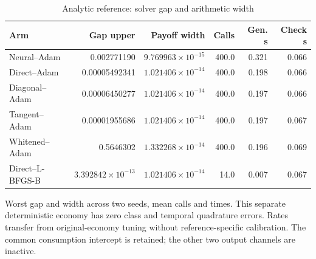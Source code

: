 \begin{table}[htbp]\centering\small
\caption{Analytic reference: solver gap and arithmetic width}\label{tab:r24reference}
\begin{tabular}{lrrrrr}\toprule
Arm & Gap upper & Payoff width & Calls & Gen. s & Check s\\\midrule
Neural--Adam & 0.002771190 & $9.769963\times10^{-15}$ & 400.0 & 0.321 & 0.066\\
Direct--Adam & 0.00005492341 & $1.021406\times10^{-14}$ & 400.0 & 0.198 & 0.066\\
Diagonal--Adam & 0.00006450277 & $1.021406\times10^{-14}$ & 400.0 & 0.197 & 0.066\\
Tangent--Adam & 0.00001955686 & $1.021406\times10^{-14}$ & 400.0 & 0.197 & 0.067\\
Whitened--Adam & 0.5646302 & $1.332268\times10^{-14}$ & 400.0 & 0.196 & 0.069\\
Direct--L-BFGS-B & $3.392842\times10^{-13}$ & $1.021406\times10^{-14}$ & 14.0 & 0.007 & 0.067\\
\bottomrule\end{tabular}
\par\smallskip\begin{minipage}{.97\textwidth}\footnotesize Worst gap and width across two seeds, mean calls and times. This separate deterministic economy has zero class and temporal quadrature errors. Rates transfer from original-economy tuning without reference-specific calibration. The common consumption intercept is retained; the other two output channels are inactive.\end{minipage}
\end{table}
